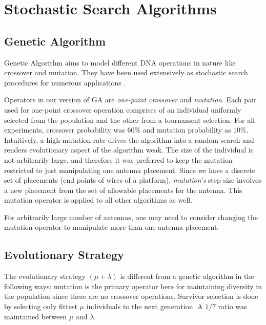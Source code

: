 \documentclass[conference]{IEEEtran}
\begin{document}
\section{Stochastic Search Algorithms}
\label{sec:algorithms}
\subsection{Genetic Algorithm}
\label{sec:algorithms-ga}
Genetic Algorithm aims to model different DNA operations in nature like crossover and mutation. They have been used extensively as stochastic search procedures for numerous applications \cite{fogel1994}.

Operators in our version of GA are \textit{one-point crossover} and \textit{mutation}. Each pair used for one-point crossover operation comprises of an individual uniformly selected from the population and the other from a tournament selection. For all experiments, crossover probability was $60\%$ and mutation probability as $10\%$. Intuitively, a high mutation rate drives the algorithm into a random search and renders evolutionary aspect of the algorithm weak. The size of the individual is not arbitrarily large, and therefore it was preferred to keep the mutation restricted to just manipulating one antenna placement. Since we have a discrete set of placements (end points of wires of a platform), \textit{mutation's} step size involves a new placement from the set of allowable placements for the antenna. This mutation operator is applied to all other algorithms as well.

For arbitrarily large number of antennas, one may need to consider changing the mutation operator to manipulate more than one antenna placement. 
\subsection{Evolutionary Strategy}
\label{sec:algorithms-es}
The evolutionary strategy $(\mu + \lambda)$ is different from a genetic algorithm in the following ways: 
mutation is the primary operator here for maintaining diversity in the population since there are no crossover operations. Survivor selection is done by selecting only fittest $\mu$ individuals to the next generation. A $1/7$ ratio was maintained between $\mu$ and $\lambda$. 
\end{document}
